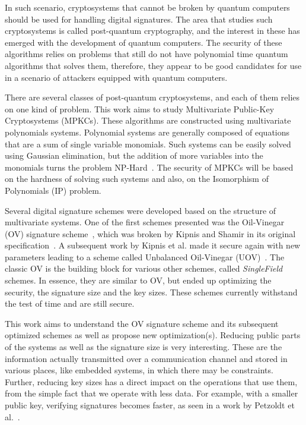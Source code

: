 \documentclass{ufsctex/ufsctex}
\begin{document}
In such scenario, cryptosystems that cannot be broken by quantum computers
should be used for handling digital signatures. The area that studies such
cryptosystems is called post-quantum cryptography, and the interest in these
has emerged with the development of quantum computers. The security of these
algorithms relies on problems that still do not have polynomial time quantum
algorithms that solves them, therefore, they appear to be good candidates for
use in a scenario of attackers equipped with quantum computers.

There are several classes of post-quantum cryptosystems, and each of them
relies on one kind of problem. This work aims to study Multivariate Public-Key
Cryptosystems (MPKCs). These algorithms are constructed using multivariate
polynomials systems.  Polynomial systems are generally composed of equations
that are a sum of single variable monomials. Such systems can be easily solved
using Gaussian elimination, but the addition of more variables into the
monomials turns the problem NP-Hard~\cite{garey1990npc}. The security of MPKCs
will be based on the hardness of solving such systems and also, on the
Isomorphism of Polynomials (IP) problem.

Several digital signature schemes were developed based on the structure of
multivariate systems. One of the first schemes presented was the Oil-Vinegar
(OV) signature scheme~\cite{patarin1997ov}, which was broken by Kipnis and
Shamir in its original specification~\cite{kipnis1998cryptanalysis}. A
subsequent work by Kipnis et al. made it secure again with new parameters
leading to a scheme called Unbalanced Oil-Vinegar
(UOV)~\cite{kipnis1999unbalanced}. The classic OV is the building block for
various other schemes, called \textit{SingleField} schemes. In essence, they
are similar to OV, but ended up optimizing the security, the signature size and
the key sizes. These schemes currently withstand the test of time and are still
secure.

This work aims to understand the OV signature scheme and its subsequent
optimized schemes as well as propose new optimization(s). Reducing public parts
of the systems as well as the signature size is very interesting.  These are
the information actually transmitted over a communication channel and stored in
various places, like embedded systems, in which there may be constraints.
Further, reducing key sizes has a direct impact on the operations that use
them, from the simple fact that we operate with less data.  For example, with a
smaller public key, verifying signatures becomes faster, as seen in a work by
Petzoldt et al.~\cite{petzoldt2011small}.
\end{document}
